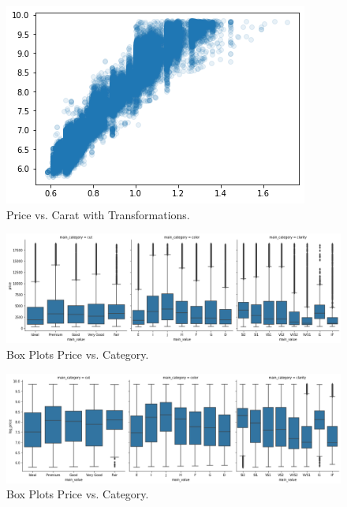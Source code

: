 \begin{figure}
	\includegraphics{images/figure52.png}
	\caption{Price vs. Carat with Transformations.}\label{fig:figure52}
\end{figure}

\begin{figure}
	\includegraphics[width=\textwidth,height=\textheight,keepaspectratio]{images/figure53.png}
	\caption{Box Plots Price vs. Category.}\label{fig:figure53}
\end{figure}

\begin{figure}
	\includegraphics[width=\textwidth,height=\textheight,keepaspectratio]{images/figure54.png}
	\caption{Box Plots Price vs. Category.}\label{fig:figure54}
\end{figure}